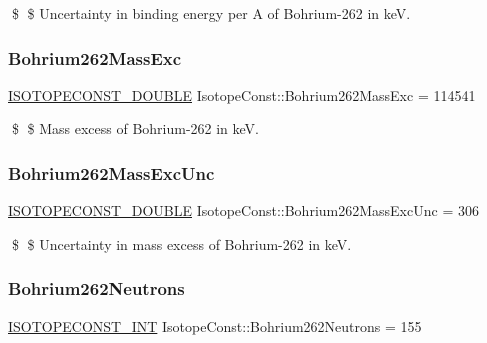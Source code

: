 \$ \$ Uncertainty in binding energy per A of Bohrium-\/262 in keV. \mbox{\label{group___isotope_const-_bohrium-_bh262_ga8ea1b76178026baf3ed4e27cea766cf1}} 
\subsubsection{\texorpdfstring{Bohrium262\+Mass\+Exc}{Bohrium262MassExc}}
{\footnotesize\ttfamily \mbox{\hyperlink{group___isotope_const-_macros_ga8f45a7272ce02c0b4c65c44636ed719a}{I\+S\+O\+T\+O\+P\+E\+C\+O\+N\+S\+T\+\_\+\+D\+O\+U\+B\+LE}} Isotope\+Const\+::\+Bohrium262\+Mass\+Exc = 114541}

\$ \$ Mass excess of Bohrium-\/262 in keV. \mbox{\label{group___isotope_const-_bohrium-_bh262_ga14e0b0ee8496f5511980faf8db6687ae}} 
\subsubsection{\texorpdfstring{Bohrium262\+Mass\+Exc\+Unc}{Bohrium262MassExcUnc}}
{\footnotesize\ttfamily \mbox{\hyperlink{group___isotope_const-_macros_ga8f45a7272ce02c0b4c65c44636ed719a}{I\+S\+O\+T\+O\+P\+E\+C\+O\+N\+S\+T\+\_\+\+D\+O\+U\+B\+LE}} Isotope\+Const\+::\+Bohrium262\+Mass\+Exc\+Unc = 306}

\$ \$ Uncertainty in mass excess of Bohrium-\/262 in keV. \mbox{\label{group___isotope_const-_bohrium-_bh262_ga6c7770036031493b9e5ec222c06522c5}} 
\subsubsection{\texorpdfstring{Bohrium262\+Neutrons}{Bohrium262Neutrons}}
{\footnotesize\ttfamily \mbox{\hyperlink{group___isotope_const-_macros_ga5f18360b3e99483a35c32d789e62621c}{I\+S\+O\+T\+O\+P\+E\+C\+O\+N\+S\+T\+\_\+\+I\+NT}} Isotope\+Const\+::\+Bohrium262\+Neutrons = 155}

